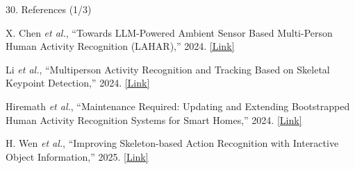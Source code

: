 \documentclass[aspectratio=169,11pt]{beamer}
\begin{document}
\begin{frame}{30. References (1/3)}

\footnotesize
\color{black}
\raggedright

\begin{list}
    {}
    {
        \setlength{\leftmargin}{0.45cm}
        \setlength{\labelwidth}{0cm}
        \setlength{\labelsep}{0.10cm}
        \setlength{\itemsep}{8pt}
        \setlength{\parsep}{0pt}
        \setlength{\topsep}{0pt}
    }

\item[\textbf{[1]}]
X. Chen \emph{et al.}, ``Towards LLM-Powered Ambient Sensor Based
Multi-Person Human Activity Recognition (LAHAR),'' 2024.
\hspace{2pt}
\href{https://ieeexplore.ieee.org/document/10763542/}
{\textcolor{AmritaMaroon}{[Link]}}

\item[\textbf{[2]}]
Li \emph{et al.}, ``Multiperson Activity Recognition and Tracking
Based on Skeletal Keypoint Detection,'' 2024.
\hspace{2pt}
\href{https://www.researchgate.net/publication/374189243_Multiperson_Activity_Recognition_and_Tracking_Based_on_Skeletal_Keypoint_Detection}
{\textcolor{AmritaMaroon}{[Link]}}

\item[\textbf{[3]}]
Hiremath \emph{et al.}, ``Maintenance Required: Updating and Extending
Bootstrapped Human Activity Recognition Systems for Smart Homes,'' 2024.
\hspace{2pt}
\href{https://arxiv.org/pdf/2406.14446}
{\textcolor{AmritaMaroon}{[Link]}}

\item[\textbf{[4]}]
H. Wen \emph{et al.}, ``Improving Skeleton-based Action Recognition
with Interactive Object Information,'' 2025.
\hspace{2pt}
\href{https://arxiv.org/abs/2501.05066}
{\textcolor{AmritaMaroon}{[Link]}}

\end{list}

\end{frame}


\end{document}
